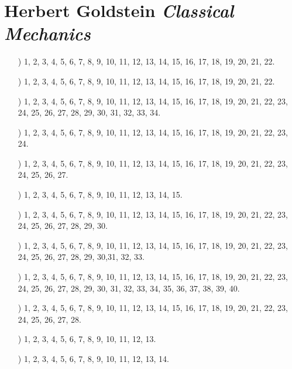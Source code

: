 \documentclass[a4paper,11pt]{article}
\numberwithin{equation}{section}
\begin{document}
\section{Herbert Goldstein \textit{Classical Mechanics}}

\label{sec:Oznaczenia-i-konwencje}


\begin{itemize}

\item[\romannumeral1)] 1, 2, 3, 4, 5, 6, 7, 8, 9, 10, 11, 12, 13, 14, 15,
  16, 17, 18, 19, 20, 21, 22.

\item[\romannumeral2)]  1, 2, 3, 4, 5, 6, 7, 8, 9, 10, 11, 12, 13, 14, 15,
  16, 17, 18, 19, 20, 21, 22.

\item[\romannumeral3)] 1, 2, 3, 4, 5, 6, 7, 8, 9, 10, 11, 12, 13, 14, 15,
  16, 17, 18, 19, 20, 21, 22, 23, 24, 25, 26, 27, 28, 29, 30, 31, 32, 33,
  34.

\item[\romannumeral4)] 1, 2, 3, 4, 5, 6, 7, 8, 9, 10, 11, 12, 13, 14, 15,
  16, 17, 18, 19, 20, 21, 22, 23, 24.

\item[\romannumeral5)] 1, 2, 3, 4, 5, 6, 7, 8, 9, 10, 11, 12, 13, 14, 15,
  16, 17, 18, 19, 20, 21, 22, 23, 24, 25, 26, 27.

\item[\romannumeral6)] 1, 2, 3, 4, 5, 6, 7, 8, 9, 10, 11, 12, 13, 14, 15.

\item[\romannumeral7)]  1, 2, 3, 4, 5, 6, 7, 8, 9, 10, 11, 12, 13, 14, 15,
  16, 17, 18, 19, 20, 21, 22, 23, 24, 25, 26, 27, 28, 29, 30.

\item[\romannumeral8)] 1, 2, 3, 4, 5, 6, 7, 8, 9, 10, 11, 12, 13, 14, 15,
  16, 17, 18, 19, 20, 21, 22, 23, 24, 25, 26, 27, 28, 29, 30,31, 32, 33.

\item[\romannumeral9)] 1, 2, 3, 4, 5, 6, 7, 8, 9, 10, 11, 12, 13, 14, 15,
  16, 17, 18, 19, 20, 21, 22, 23, 24, 25, 26, 27, 28, 29, 30, 31, 32, 33,
  34, 35, 36, 37, 38, 39, 40.

\item[\romannumeral10)] 1, 2, 3, 4, 5, 6, 7, 8, 9, 10, 11, 12, 13, 14, 15,
  16, 17, 18, 19, 20, 21, 22, 23, 24, 25, 26, 27, 28.

\item[\romannumeral11)] 1, 2, 3, 4, 5, 6, 7, 8, 9, 10, 11, 12, 13.

\item[\romannumeral12)]  1, 2, 3, 4, 5, 6, 7, 8, 9, 10, 11, 12, 13, 14.

\end{itemize}
\end{document}
